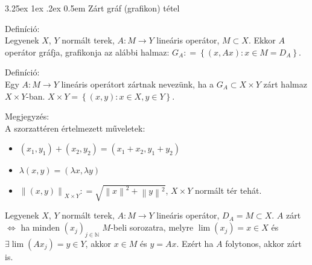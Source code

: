 \documentclass[12pt,a4paper]{scrartcl}
\makeatletter
\renewcommand\paragraph{\@startsection{paragraph}{4}{\z@}%
                                    {3.25ex \@plus1ex \@minus.2ex}%
                                    {0.5em} %
                                    {\normalfont\normalsize\bfseries}}
\providecommand{\tightlist}{%
  \setlength{\itemsep}{0pt}\setlength{\parskip}{0pt}}
\newenvironment{definicio}{}{}
\newenvironment{megjegyzes}{}{}
\makeatother
\begin{document}
\hypertarget{zart-graf-grafikon-tetel}{%
\paragraph{Zárt gráf (grafikon) tétel}\label{zart-graf-grafikon-tetel}}

\begin{definicio}

Definíció:\\
Legyenek \(X\), \(Y\) normált terek, \(\left. A:M\rightarrow Y \right.\)
lineáris operátor, \(M \subset X\). Ekkor \(A\) operátor gráfja,
grafikonja az alábbi halmaz:
\(G_{A}: = \left\{ {\left( {x,Ax} \right):x \in M = D_{A}} \right\}\).

\end{definicio}

\begin{definicio}

Definíció:\\
Egy \(\left. A:M\rightarrow Y \right.\) lineáris operátort zártnak
nevezünk, ha a \(G_{A} \subset X \times Y\) zárt halmaz
\(X \times Y\)-ban.
\(X \times Y = \left\{ {\left( {x,y} \right):x \in X,y \in Y} \right\}\).

\end{definicio}

\begin{megjegyzes}

Megjegyzés:\\
A szorzattéren értelmezett műveletek:

\begin{itemize}
\tightlist
\item
  \(\left( {x_{1},y_{1}} \right) + \left( {x_{2},y_{2}} \right) = \left( {x_{1} + x_{2},y_{1} + y_{2}} \right)\)
\item
  \(\lambda\left( {x,y} \right) = \left( {\lambda x,\lambda y} \right)\)
\item
  \(\left\| \left( {x,y} \right) \right\|_{X \times Y}: = \sqrt{\left\| x \right\|^{2} + \left\| y \right\|^{2}}\),
  \(X \times Y\) normált tér tehát.
\end{itemize}

\end{megjegyzes}

Legyenek \(X\), \(Y\) normált terek, \(\left. A:M\rightarrow Y \right.\)
lineáris operátor, \(D_{A} = M \subset X\). \(A\) zárt
\(\Leftrightarrow\) ha minden
\(\left( x_{j} \right)_{j \in {\mathbb{N}}}\) \(M\)-beli sorozatra,
melyre \(\lim\left( x_{j} \right) = x \in X\) és
\(\exists\lim\left( {Ax_{j}} \right) = y \in Y\), akkor \(x \in M\) és
\(y = Ax\). Ezért ha \(A\) folytonos, akkor zárt is.
\end{document}
